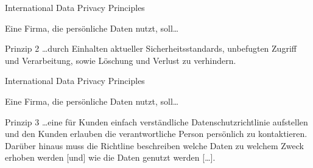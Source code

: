 \begin{frame}{International Data Privacy Principles}


    Eine Firma, die persönliche Daten nutzt, soll\dots

    \begin{block}{Prinzip 2 \cite{zankl_international_2014}}
        \dots durch Einhalten aktueller Sicherheitsstandards, unbefugten Zugriff und Verarbeitung, sowie Löschung und Verlust zu verhindern.
    \end{block}

\end{frame}

\begin{frame}{International Data Privacy Principles}


    Eine Firma, die persönliche Daten nutzt, soll\dots

    \begin{block}{Prinzip 3 \cite{zankl_international_2014}}
        \dots eine für Kunden einfach verständliche Datenschutzrichtlinie aufstellen und den Kunden erlauben die verantwortliche Person persönlich zu kontaktieren. Darüber hinaus muss die Richtline beschreiben welche Daten zu welchem Zweck erhoben werden [und] wie die Daten genutzt werden [\dots].
    \end{block}

\end{frame}

